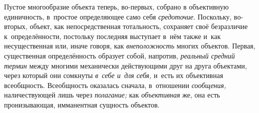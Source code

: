 
Пустое многообразие объекта теперь, во-первых, собрано в
объективную единичность, в~простое определяющее само себя
{\em средоточие}.
Поскольку, во-вторых, объект, как непосредственная
тотальность, сохраняет своё безразличие к~определённости, постольку
последняя выступает в~нём также и~как несущественная или, иначе говоря, как
{\em внеположность}
многих объектов. Первая, существенная определённость образует
собой, напротив, {\em реальный средний
термин} между многими механически действующими друг на друга
объектами, через который они сомкнуты
{\em в~себе и~для себя,}
и~есть их объективная всеобщность. Всеобщность оказалась
сначала, в~отношении {\em сообщения,}
наличествующей лишь через
{\em полагание;} как
{\em объективная} же, она
есть пронизывающая, имманентная сущность объектов.

